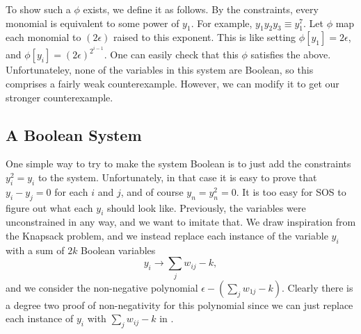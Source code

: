 To show such a $\phi$ exists, we define it as follows. By the constraints, every monomial is equivalent to some power of $y_1$. For example, $y_1y_2y_3 \equiv y_1^7$. Let $\phi$ map each monomial to $(2\epsilon)$ raised to this exponent. This is like setting $\phi[y_1] = 2\epsilon$, and $\phi[y_i] = (2\epsilon)^{2^{i-1}}$. One can easily check that this $\phi$ satisfies the above. Unfortunateley, none of the variables in this system are Boolean, so this comprises a fairly weak counterexample. However, we can modify it to get our stronger counterexample.
 
\subsection{A Boolean System}
One simple way to try to make the system Boolean is to just add the constraints $y_i^2 = y_i$ to the system. Unfortunately, in that case it is easy to prove that $y_i - y_j = 0$ for each $i$ and $j$, and of course $y_n = y_n^2 = 0$. It is too easy for SOS to figure out what each $y_i$ should look like. Previously, the variables were unconstrained in any way, and we want to imitate that. We draw inspiration from the Knapsack problem, and we instead replace each instance of the variable $y_i$ with a sum of $2k$ Boolean variables 
\[y_i \rightarrow \sum_j w_{ij} - k,\] 
and we consider the non-negative polynomial $\epsilon - (\sum_j w_{1j} - k)$. Clearly there is a degree two proof of non-negativity for this polynomial since we can just replace each instance of $y_i$ with $\sum_j w_{ij} - k$ in . 

